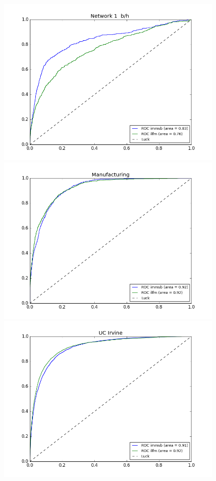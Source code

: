 \begin{figure}[h]
	\endminipage
	\includegraphics[scale=0.22]{img/M_e/AUC-ROC/figure_4}
	\endminipage
		\vspace{-0.4cm}
	\includegraphics[scale=0.22]{img/M_e/AUC-ROC/figure_5}
	\endminipage
	\includegraphics[scale=0.22]{img/M_e/AUC-ROC/figure_6}
	\endminipage
	

\end{figure}
